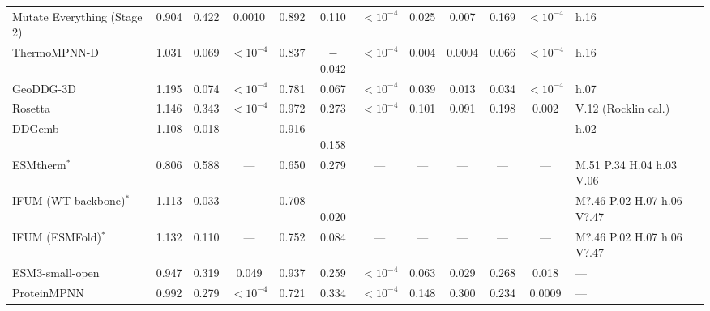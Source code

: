 \begin{table}[H]
{\begin{tabular}{lccccccccccl}
Mutate Everything (Stage 2) & 0.904 & 0.422 & 0.0010 & 0.892 & 0.110 & $<10^{-4}$ & 0.025 & 0.007 & 0.169 & $<10^{-4}$ & h.16 \\
ThermoMPNN-D & 1.031 & 0.069 & $<10^{-4}$ & 0.837 & $-$0.042 & $<10^{-4}$ & 0.004 & 0.0004 & 0.066 & $<10^{-4}$ & h.16 \\
GeoDDG-3D & 1.195 & 0.074 & $<10^{-4}$ & 0.781 & 0.067 & $<10^{-4}$ & 0.039 & 0.013 & 0.034 & $<10^{-4}$ & h.07 \\
Rosetta & 1.146 & 0.343 & $<10^{-4}$ & 0.972 & 0.273 & $<10^{-4}$ & 0.101 & 0.091 & 0.198 & 0.002 & V.12 (Rocklin cal.) \\
DDGemb & 1.108 & 0.018 & --- & 0.916 & $-$0.158 & --- & --- & --- & --- & --- & h.02 \\
ESMtherm$^*$ & 0.806 & 0.588 & --- & 0.650 & 0.279 & --- & --- & --- & --- & --- & M.51 P.34 H.04 h.03 V.06 \\
IFUM (WT backbone)$^*$ & 1.113 & 0.033 & --- & 0.708 & $-$0.020 & --- & --- & --- & --- & --- & M?.46 P.02 H.07 h.06 V?.47 \\
IFUM (ESMFold)$^*$ & 1.132 & 0.110 & --- & 0.752 & 0.084 & --- & --- & --- & --- & --- & M?.46 P.02 H.07 h.06 V?.47 \\
ESM3-small-open & 0.947 & 0.319 & 0.049 & 0.937 & 0.259 & $<10^{-4}$ & 0.063 & 0.029 & 0.268 & 0.018 & --- \\
ProteinMPNN & 0.992 & 0.279 & $<10^{-4}$ & 0.721 & 0.334 & $<10^{-4}$ & 0.148 & 0.300 & 0.234 & 0.0009 & --- \\
\bottomrule
\end{tabular}
}
\end{table}
